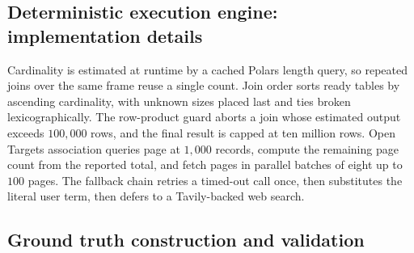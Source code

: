 \subsection*{Deterministic execution engine: implementation details}

Cardinality is estimated at runtime by a cached Polars length query, so repeated joins over the same frame reuse a single count. Join order sorts ready tables by ascending cardinality, with unknown sizes placed last and ties broken lexicographically. The row-product guard aborts a join whose estimated output exceeds $100{,}000$ rows, and the final result is capped at ten million rows. Open Targets association queries page at $1{,}000$ records, compute the remaining page count from the reported total, and fetch pages in parallel batches of eight up to $100$ pages. The fallback chain retries a timed-out call once, then substitutes the literal user term, then defers to a Tavily-backed web search.

\subsection*{Ground truth construction and validation}

